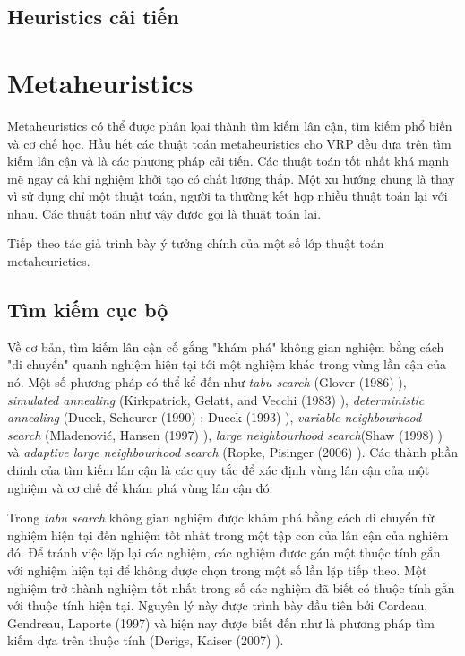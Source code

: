 \subsection{Heuristics cải tiến}

\section{Metaheuristics}

Metaheuristics có thể được phân lọai thành tìm kiếm lân cận, tìm kiếm phổ biến và cơ chế học. Hầu hết các thuật toán metaheuristics cho VRP đều dựa trên tìm kiếm lân cận và là các phương pháp cải tiến. Các thuật toán tốt nhất khá mạnh mẽ ngay cả khi nghiệm khởi tạo có chất lượng thấp. Một xu hướng chung là thay vì sử dụng chỉ một thuật toán, người ta thường kết hợp nhiều thuật toán lại với nhau. Các thuật toán như vậy được gọi là thuật toán lai.

Tiếp theo tác giả trình bày ý tưởng chính của một số lớp thuật toán metaheurictics.

\subsection{Tìm kiếm cục bộ}

Về cơ bản, tìm kiếm lân cận cố gắng "khám phá" không gian nghiệm bằng cách "di chuyển" quanh nghiệm hiện tại tới một nghiệm khác trong vùng lần cận của nó. Một số phương pháp có thể kể đến như \textit{tabu search} (Glover (1986) \cite{glover1986future}), \textit{simulated annealing} (Kirkpatrick, Gelatt, and Vecchi
(1983) \cite{kirkpatrick1983optimization}), \textit{deterministic annealing} (Dueck, Scheurer
(1990) \cite{dueck1990threshold}; Dueck (1993) \cite{dueck1993new}), \textit{variable neighbourhood search} (Mladenović, Hansen (1997) \cite{mladenovic1997variable}), \textit{large neighbourhood search}(Shaw (1998) \cite{shaw1998using}) và \textit{adaptive large neighbourhood search} (Ropke, Pisinger (2006) \cite{ropke2006adaptive}). Các thành phần chính của tìm kiếm lân cận là các quy tắc để xác định vùng lân cận của một nghiệm và cơ chế để khám phá vùng lân cận đó.

Trong \textit{tabu search} không gian nghiệm được khám phá bằng cách di chuyển từ nghiệm hiện tại đến nghiệm tốt nhất trong một tập con của lân cận của nghiệm đó. Để tránh việc lặp lại các nghiệm, các nghiệm được gán một thuộc tính gắn với nghiệm hiện tại để không được chọn trong một số lần lặp tiếp theo. Một nghiệm trở thành nghiệm tốt nhất trong số các nghiệm đã biết có thuộc tính gắn với thuộc tính hiện tại. Nguyên lý này được trình bày đầu tiên bởi Cordeau, Gendreau, Laporte (1997) \cite{cordeau1997tabu} và hiện nay được biết đến như là phương pháp tìm kiếm dựa trên thuộc tính (Derigs, Kaiser (2007) \cite{derigs2007applying}).

